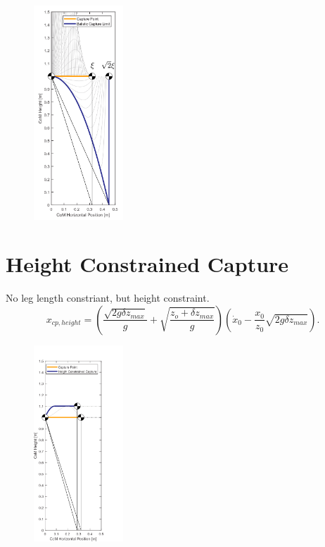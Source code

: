 \begin{figure}[h]
\centering
\includegraphics[width=0.3\textwidth]{STYLESTUFF/CPvsBalistic.png}
\caption{}
\label{fig:cpbal}
\end{figure}

\section{Height Constrained Capture}
No leg length constriant, but height constraint.
\begin{equation}
    x_{cp,height}=(\frac{\sqrt{2g\delta z_{max}}}{g}+\sqrt{\frac{z_o+\delta z_{max}}{g}})(\dot{x}_0-\frac{x_0}{z_0}\sqrt{2g\delta z_{max}}).
\end{equation}
\begin{figure}[h]
\centering
\includegraphics[width=0.3\textwidth]{STYLESTUFF/CPvsHeight.png}
\caption{}
\label{fig:cpbal}
\end{figure}

